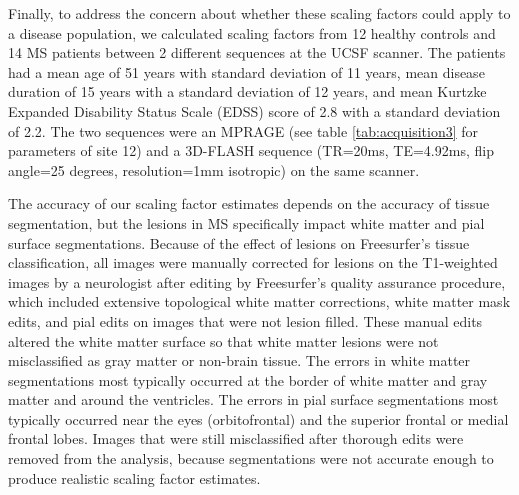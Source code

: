 Finally, to address the concern about whether these scaling factors could apply to a disease population, we calculated scaling factors from 12 healthy controls and 14 MS patients between 2 different sequences at the UCSF scanner. The patients had a mean age of 51 years with standard deviation of 11 years, mean disease duration of 15 years with a standard deviation of 12 years, and mean Kurtzke Expanded Disability Status Scale (EDSS) \cite{Kurtzke_1983} score of 2.8 with a standard deviation of 2.2. The two sequences were an MPRAGE (see table \ref{tab:acquisition3} for parameters of site 12) and a 3D-FLASH sequence (TR=20ms, TE=4.92ms, flip angle=25 degrees, resolution=1mm isotropic) on the same scanner. 

The accuracy of our scaling factor estimates depends on the accuracy of tissue segmentation, but the lesions in MS specifically impact white matter and pial surface segmentations. Because of the effect of lesions on Freesurfer's tissue classification, all images were manually corrected for lesions on the T1-weighted images by a neurologist after editing by Freesurfer's quality assurance procedure, which included extensive topological white matter corrections, white matter mask edits, and pial edits on images that were not lesion filled.  These manual edits altered the white matter surface so that white matter lesions were not misclassified as gray matter or non-brain tissue. The errors in white matter segmentations most typically occurred at the border of white matter and gray matter and around the ventricles. The errors in pial surface segmentations most typically occurred near the eyes (orbitofrontal) and the superior frontal or medial frontal lobes. Images that were still misclassified after thorough edits were removed from the analysis, because segmentations were not accurate enough to produce realistic scaling factor estimates.